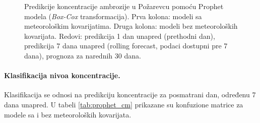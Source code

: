 \documentclass[12pt]{article}
\begin{document}
\begin{figure}[H]
    \centering



    \caption{Predikcije koncentracije ambrozije u Požarevcu pomoću Prophet modela (\textit{Box-Cox} transformacija).  
    Prva kolona: modeli sa meteorološkim kovarijatima. Druga kolona: modeli bez meteoroloških kovarijata.  
    Redovi: predikcija 1 dan unapred (prethodni dan), predikcija 7 dana unapred (rolling forecast, podaci dostupni pre 7 dana), prognoza za narednih 30 dana.}
    \label{fig:prophet_forecast_3x2}
\end{figure}


\paragraph{\textbf{Klasifikacija nivoa koncentracije.}}  
Klasifikacija se odnosi na predikciju koncentracije za posmatrani dan, određenu 7 dana unapred.  
U tabeli \ref{tab:prophet_cm} prikazane su konfuzione matrice za modele sa i bez meteoroloških kovarijata.
\end{document}
